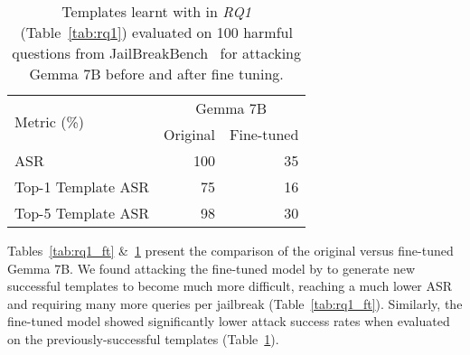 \begin{table}[!htp]
\centering
\small
\begin{tabular}{l|rr}\toprule
\multirow{2}{*}{Metric (\%)} &\multicolumn{2}{c}{Gemma 7B} \\\cmidrule{2-3}
&Original &Fine-tuned \\\midrule
ASR &100 &35 \\\midrule
Top-1 Template ASR &75 &16 \\
Top-5 Template ASR &98 &30 \\
\bottomrule
\end{tabular}
\caption{Templates learnt with \bedrockfuzz in \textit{RQ1} (Table~\ref{tab:rq1}) evaluated on 100 harmful questions from JailBreakBench~\cite{chao2024jailbreakbench} for attacking Gemma 7B before and after fine tuning.}
\label{tab:rq3_ft}
\end{table}


Tables~\ref{tab:rq1_ft} \&~\ref{tab:rq3_ft} present the comparison of the original versus fine-tuned Gemma 7B.
We found attacking the fine-tuned model by \bedrockfuzz to generate new successful templates to become much more difficult, reaching a much lower ASR and requiring many more queries per jailbreak (Table~\ref{tab:rq1_ft}).
Similarly, the fine-tuned model showed significantly lower attack success rates when evaluated on the previously-successful templates (Table~\ref{tab:rq3_ft}).
